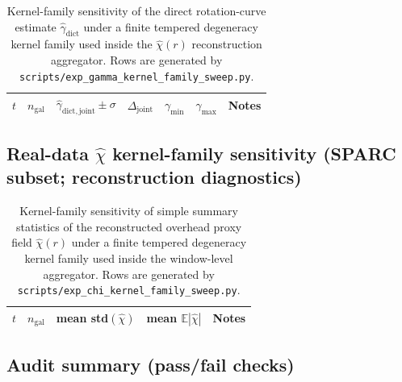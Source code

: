 \begin{table}[H]
\centering
\scriptsize
\setlength{\tabcolsep}{6pt}
\renewcommand{\arraystretch}{1.15}
\begin{tabular}{r r l r r r p{5.8cm}}
\toprule
$t$ & $n_{\mathrm{gal}}$ & $\widehat\gamma_{\mathrm{dict,joint}} \pm \sigma$ & $\Delta_{\mathrm{joint}}$ & $\gamma_{\min}$ & $\gamma_{\max}$ & Notes \\
\midrule
%
\end{tabular}
\caption{Kernel-family sensitivity of the direct rotation-curve estimate $\widehat\gamma_{\mathrm{dict}}$ under a finite tempered degeneracy kernel family used inside the $\widehat\chi(r)$ reconstruction aggregator. Rows are generated by \texttt{scripts/exp\_gamma\_kernel\_family\_sweep.py}.}
\label{tab:gamma_kernel_family_direct_realdata}
\end{table}

\subsection{Real-data $\widehat\chi$ kernel-family sensitivity (SPARC subset; reconstruction diagnostics)}

\begin{table}[H]
\centering
\scriptsize
\setlength{\tabcolsep}{6pt}
\renewcommand{\arraystretch}{1.15}
\begin{tabular}{r r r r p{7.0cm}}
\toprule
$t$ & $n_{\mathrm{gal}}$ & mean std$(\widehat\chi)$ & mean $\mathbb{E}|\widehat\chi|$ & Notes \\
\midrule
%
\end{tabular}
\caption{Kernel-family sensitivity of simple summary statistics of the reconstructed overhead proxy field $\widehat\chi(r)$ under a finite tempered degeneracy kernel family used inside the window-level aggregator. Rows are generated by \texttt{scripts/exp\_chi\_kernel\_family\_sweep.py}.}
\label{tab:chi_kernel_family_realdata}
\end{table}

\subsection{Audit summary (pass/fail checks)}

\begin{center}
\small
\setlength{\tabcolsep}{8pt}
\renewcommand{\arraystretch}{1.15}
%
\end{center}

